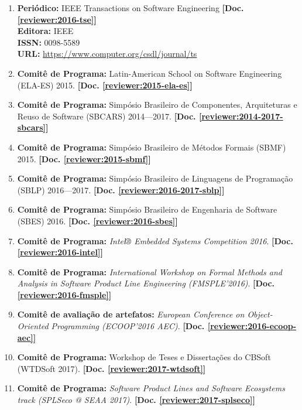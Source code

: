 \documentclass[a4paper,oneside,10pt]{article}
\begin{document}
\begin{enumerate}
\item   \textbf{Peri\'{o}dico:} IEEE Transactions on Software Engineering \textbf{[Doc. \ref{reviewer:2016-tse}]}\\
        \textbf{Editora:} IEEE\\
        \textbf{ISSN:} 0098-5589\\
        \textbf{URL:} \url{https://www.computer.org/csdl/journal/ts}

\item   \textbf{Comitê de Programa:} Latin-American School on Software Engineering (ELA-ES) 2015. \textbf{[Doc. \ref{reviewer:2015-ela-es}]}

\item   \textbf{Comitê de Programa:} Simpósio Brasileiro de Componentes, Arquiteturas e Reuso de Software (SBCARS) 2014---2017. \textbf{[Doc. \ref{reviewer:2014-2017-sbcars}]}

\item   \textbf{Comitê de Programa:} Simpósio Brasileiro de Métodos Formais (SBMF) 2015. \textbf{[Doc. \ref{reviewer:2015-sbmf}]}

\item   \textbf{Comitê de Programa:} Simpósio Brasileiro de Linguagens de Programação (SBLP) 2016---2017. \textbf{[Doc. \ref{reviewer:2016-2017-sblp}]}

\item   \textbf{Comitê de Programa:} Simpósio Brasileiro de Engenharia de Software (SBES) 2016. \textbf{[Doc. \ref{reviewer:2016-sbes}]}

\item   \textbf{Comitê de Programa:} \emph{Intel® Embedded Systems Competition 2016}. \textbf{[Doc. \ref{reviewer:2016-intel}]}

\item   \textbf{Comitê de Programa:} \emph{International Workshop on Formal Methods and Analysis in Software Product Line Engineering (FMSPLE'2016)}. \textbf{[Doc. \ref{reviewer:2016-fmsple}]}

\item   \textbf{Comitê de avaliação de artefatos:} \emph{European Conference on Object-Oriented Programming (ECOOP'2016 AEC)}. \textbf{[Doc. \ref{reviewer:2016-ecoop-aec}]}

\item   \textbf{Comitê de Programa:} Workshop de Teses e Dissertações do CBSoft (WTDSoft 2017). \textbf{[Doc. \ref{reviewer:2017-wtdsoft}]}

\item   \textbf{Comitê de Programa:} \emph{Software Product Lines and Software Ecosystems track (SPLSeco @ SEAA 2017)}. \textbf{[Doc. \ref{reviewer:2017-splseco}]}

\end{enumerate}
\end{document}
